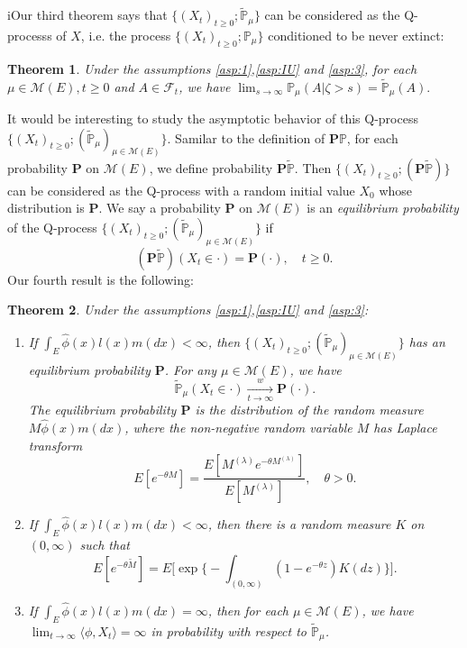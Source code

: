 \documentclass[12pt,a4paper]{amsart}
\numberwithin{equation}{section}
\theoremstyle{plain}
\newtheorem{thm}{Theorem}[section]
\theoremstyle{definition}
\begin{document}
iOur third theorem says that $\{(X_t)_{t\geq 0}; \widetilde{\mathbb P}_{\mu}\}$ can be considered as the Q-processs of $X$, i.e. the process $\{(X_t)_{t\geq 0}; \mathbb P_{\mu}\}$ conditioned to be never extinct:
\begin{thm}\label{thm:Q_process}
	Under the assumptions \ref{asp:1},\ref{asp:IU} and \ref{asp:3}, for each  $\mu \in \mathcal M(E), t\geq 0$ and $A\in\mathscr F_t$, we have $\lim_{s\rightarrow\infty}\mathbb P_\mu(A |\zeta>s)=\widetilde{\mathbb P}_\mu(A). $
\end{thm}

It would be interesting to study the asymptotic behavior of this Q-process $\{(X_t)_{t\geq 0}; (\widetilde{\mathbb P}_\mu)_{\mu \in \mathcal M(E)}\}$.
Samilar to the definition of $\mathbf P\mathbb P$, for each probability $\mathbf
P$ on $\mathcal M(E)$, we define probability $\mathbf P\widetilde{\mathbb P}$.
Then $\{(X_t)_{t\geq 0}; (\mathbf P\widetilde{\mathbb P})\}$ can be considered as the Q-process with a random initial value $X_0$ whose distribution is $\mathbf P$.
We say a probability $\mathbf P$ on $\mathcal M(E)$ is an \emph{equilibrium probability} of the Q-process $\{(X_t)_{t\geq 0}; (\widetilde{\mathbb P}_\mu)_{\mu\in\mathcal M(E)}\}$ if
\[
	(\mathbf P\widetilde{\mathbb P})(X_t \in \cdot ) =\mathbf P(\cdot),	\quad t\geq 0.
\]
Our fourth result is the following:
\begin{thm}\label{thm:structure_of_Qprocess}
	Under the assumptions \ref{asp:1},\ref{asp:IU} and \ref{asp:3}:
  \begin{enumerate}
  \item
    If $\int_E\widehat\phi(x)l(x)m(dx)<\infty$, then $\{(X_t)_{t\geq 0};(\widetilde{\mathbb P}_\mu)_{\mu\in\mathcal M(E)}\}$ has an equilibrium probability ${\mathbf P}$.
    For any $\mu\in\mathcal M(E)$, we have
    \[
      \widetilde{\mathbb P}_\mu(X_t \in \cdot ) \xrightarrow[t\to \infty]{w} {\mathbf P}(\cdot).
    \]
    The equilibrium probability $\mathbf P$ is the distribution of the random measure $M\widehat\phi(x)m(dx)$, where the non-negative random variable $M$ has Laplace transform
    \[
      E[e^{-\theta  M}] = \dfrac{E[M^{(\lambda)}e^{-\theta M^{(\lambda)}}]}{E[M^{(\lambda)}]},\quad \theta > 0.
    \]
  \item
    If $\int_E\widehat\phi(x)l(x)m(dx)<\infty$, then there is a random measure $K$ on $(0,\infty)$ such that
    \[
      E[e^{-\theta \widetilde M}] = E\Big[\exp\Big\{- \int_{(0,\infty)} (1-e^{-\theta z }) K(dz) \Big\}\Big].
    \]
  \item
    If $\int_E\widehat\phi(x)l(x)m(dx)=\infty$, then for each $\mu \in \mathcal M(E)$, we have $\lim_{t\rightarrow\infty}\langle \phi, X_t\rangle =\infty$ in probability with respect to $\widetilde{\mathbb P}_\mu$.
  \end{enumerate}
\end{thm}
\end{document}
